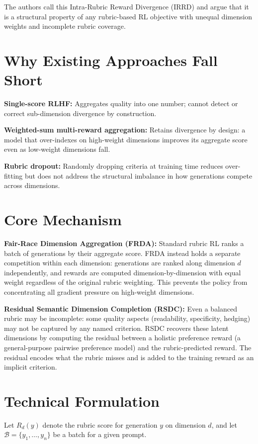 \documentclass[10pt,twocolumn]{article}
\begin{document}
The authors call this Intra-Rubric Reward Divergence (IRRD) and argue that
it is a structural property of any rubric-based RL objective with unequal
dimension weights and incomplete rubric coverage.

\section{Why Existing Approaches Fall Short}

\textbf{Single-score RLHF:} Aggregates quality into one number; cannot
detect or correct sub-dimension divergence by construction.

\textbf{Weighted-sum multi-reward aggregation:} Retains divergence by
design: a model that over-indexes on high-weight dimensions improves its
aggregate score even as low-weight dimensions fall.

\textbf{Rubric dropout:} Randomly dropping criteria at training time
reduces over-fitting but does not address the structural imbalance in
how generations compete across dimensions.

\section{Core Mechanism}

\textbf{Fair-Race Dimension Aggregation (FRDA):} Standard rubric RL ranks
a batch of generations by their aggregate score. FRDA instead holds a
separate competition within each dimension: generations are ranked along
dimension $d$ independently, and rewards are computed dimension-by-dimension
with equal weight regardless of the original rubric weighting. This prevents
the policy from concentrating all gradient pressure on high-weight dimensions.

\textbf{Residual Semantic Dimension Completion (RSDC):} Even a balanced
rubric may be incomplete: some quality aspects (readability, specificity,
hedging) may not be captured by any named criterion. RSDC recovers these
latent dimensions by computing the residual between a holistic preference
reward (a general-purpose pairwise preference model) and the rubric-predicted
reward. The residual encodes what the rubric misses and is added to the
training reward as an implicit criterion.

\section{Technical Formulation}

Let $R_d(y)$ denote the rubric score for generation $y$ on dimension $d$,
and let $\mathcal{B} = \{y_1,\ldots,y_n\}$ be a batch for a given prompt.
\end{document}
